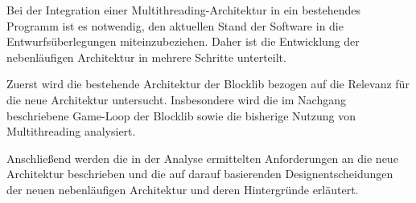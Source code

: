 Bei der Integration einer Multithreading-Architektur in ein bestehendes \gls{Programm} ist es notwendig, den aktuellen Stand der Software in die Entwurfsüberlegungen miteinzubeziehen. Daher ist die Entwicklung der nebenläufigen Architektur in mehrere Schritte unterteilt.

Zuerst wird die bestehende Architektur der Blocklib bezogen auf die Relevanz für die neue Architektur untersucht. Insbesondere wird die im Nachgang beschriebene Game-Loop der Blocklib sowie die bisherige Nutzung von Multithreading analysiert.

Anschließend werden die in der Analyse ermittelten Anforderungen an die neue Architektur beschrieben und die auf darauf basierenden Designentscheidungen der neuen nebenläufigen Architektur und deren Hintergründe erläutert.